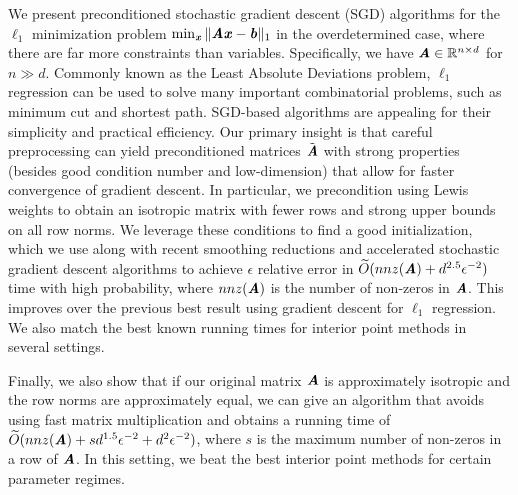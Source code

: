We present preconditioned stochastic gradient descent (SGD) algorithms for the $\ell_1$ minimization problem $\min_{\xx}\|\AA \xx - \bb\|_1$ in the overdetermined case, where there are far more constraints than variables. Specifically, we have $\AA \in \R^{n \times d}$ for $n \gg d$. Commonly known as the Least Absolute Deviations problem, $\ell_1$ regression can be used to solve many important combinatorial problems, such as minimum cut and shortest path. SGD-based algorithms are appealing for their simplicity and practical efficiency.
Our primary insight is that careful preprocessing can yield preconditioned matrices $\tilde{\AA}$ with strong properties (besides good condition number and low-dimension) that allow for faster convergence of gradient descent. In particular, we precondition using Lewis weights to obtain an isotropic matrix with fewer rows and strong upper bounds on all row norms. We leverage these conditions to find a good initialization, which we use along with recent smoothing reductions and accelerated stochastic gradient descent algorithms to achieve $\epsilon$ relative error in $\Otil(nnz(\AA) + d^{2.5} \epsilon^{-2})$ time with high probability, where $nnz(\AA)$ is the number of non-zeros in $\AA$. This improves over the previous best result using gradient descent for $\ell_1$ regression. We also match the best known running times for interior point methods in several settings.

Finally, we also show that if our original matrix $\AA$ is approximately isotropic and the row norms are approximately equal, we can give an algorithm that avoids using fast matrix multiplication and obtains a running time of $\Otil(nnz(\AA) + s d^{1.5}\epsilon^{-2} + d^2\epsilon^{-2})$, where $s$ is the maximum number of non-zeros in a row of $\AA$. In this setting, we beat the best interior point methods for certain parameter regimes.


